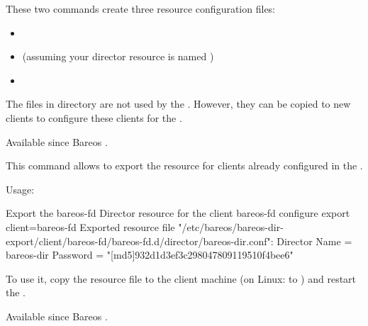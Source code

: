 \begin{description}
\begin{description}
These two commands create three resource configuration files:
\begin{itemize}
  \item {}
  \item {} (assuming your director resource is named )
  \item {}
\end{itemize}

The files in  directory are not used by the \bareosDir.
However, they can be copied to new clients to configure these clients for the \bareosDir.


    Available since Bareos .


    \item [configure export]
        \label{sec:bcommandConfigureExport}

        This command allows to export the  resource for clients already configured in the \bareosDir.

        Usage:
\begin{bconsole}{Export the bareos-fd Director resource for the client bareos-fd}
configure export client=bareos-fd
Exported resource file "/etc/bareos/bareos-dir-export/client/bareos-fd/bareos-fd.d/director/bareos-dir.conf":
Director {
  Name = bareos-dir
  Password = "[md5]932d1d3ef3c298047809119510f4bee6"
}
\end{bconsole}

        To use it, copy the  resource file to the client machine 
        (on Linux: to ) and restart the \bareosFd.

        Available since Bareos .

    \end{description}



\end{description}
